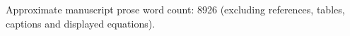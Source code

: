 \noindent Approximate manuscript prose word count: 8926 (excluding references, tables, captions and displayed equations).\par

